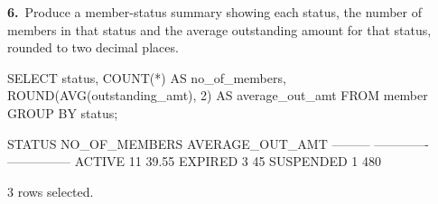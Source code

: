 \noindent\begin{minipage}{\linewidth}
\begingroup{}
{\fontsize{14}{17}\selectfont\textbf{6.}}\ Produce a member-status summary showing each status, the number of members in that status and the average outstanding amount for that status, rounded to two decimal places.\par
\endgroup\vspace{12pt}


\begin{sqlcode}
SELECT status, COUNT(*) AS no_of_members,
       ROUND(AVG(outstanding_amt), 2) AS average_out_amt
FROM member
GROUP BY status;
\end{sqlcode}

\vspace{18pt}


\begin{sqlout}[fontsize=\small]
STATUS     NO_OF_MEMBERS  AVERAGE_OUT_AMT
---------  -------------  ---------------
ACTIVE                11            39.55
EXPIRED                3               45
SUSPENDED              1              480

3 rows selected.
\end{sqlout}
\end{minipage}\par\vspace{24pt}

